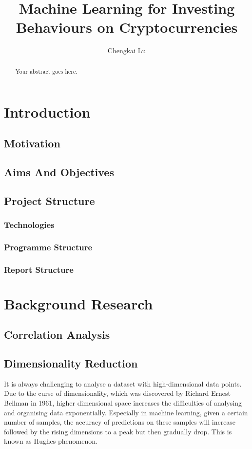 \documentclass[11pt]{article} %
\title{Machine Learning for Investing Behaviours on Cryptocurrencies}
\author{Chengkai Lu}
\theoremstyle{plain}
\theoremstyle{definition}
\begin{document}
\maketitle

\declaration

\begin{abstract}
  Your abstract goes here.
\end{abstract}

\section{Introduction}
\subsection{Motivation}
\subsection{Aims And Objectives}
\subsection{Project Structure}
\subsubsection{Technologies}
\subsubsection{Programme Structure}
\subsubsection{Report Structure}

\section{Background Research}
\subsection{Correlation Analysis}
\subsection{Dimensionality Reduction}

It is always challenging to analyse a dataset with high-dimensional data points. Due to the curse of dimensionality, which was discovered by Richard Ernest Bellman in 1961, higher dimensional space increases the difficulties of analysing and organising data exponentially\cite{wiki/cod:2018}. Especially in machine learning, given a certain number of samples, the accuracy of predictions on these samples will increase followed by the rising dimensions to a peak but then gradually drop. This is known as Hughes phenomenon\cite{hughes/itoit:1968}.
\end{document}
